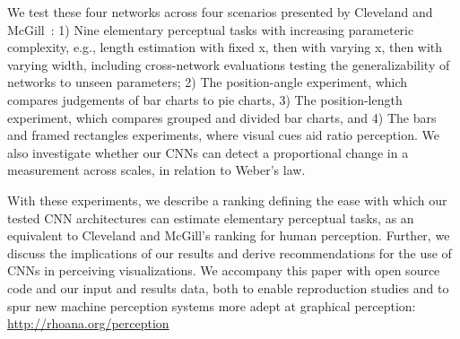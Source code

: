 We test these four networks across four scenarios presented by Cleveland and McGill~\cite{cleveland_mcgill}: 1) Nine elementary perceptual tasks with increasing parameteric complexity, e.g., length estimation with fixed x, then with varying x, then with varying width, including cross-network evaluations testing the generalizability of networks to unseen parameters; 2) The position-angle experiment, which compares judgements of bar charts to pie charts, 3) The position-length experiment, which compares grouped and divided bar charts, and 4) The bars and framed rectangles experiments, where visual cues aid ratio perception. We also investigate whether our CNNs can detect a proportional change in a measurement across scales, in relation to Weber's law.

With these experiments, we describe a ranking defining the ease with which our tested CNN architectures can estimate elementary perceptual tasks, as an equivalent to Cleveland and McGill's ranking for human perception. Further, we discuss the implications of our results and derive recommendations for the use of CNNs in perceiving visualizations. We accompany this paper with open source code and our input and results data, both to enable reproduction studies and to spur new machine perception systems more adept at graphical perception: \url{http://rhoana.org/perception}




